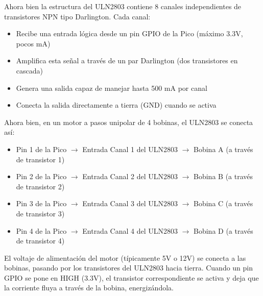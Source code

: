 \documentclass[letterpaper,12pt]{article}
\begin{document}
    Ahora bien la estructura del ULN2803 contiene 8 canales independientes de transistores NPN tipo Darlington. Cada canal:
    \begin{itemize}
        \item Recibe una entrada lógica desde un pin GPIO de la Pico (máximo 3.3V, pocos mA)
        \item Amplifica esta señal a través de un par Darlington (dos transistores en cascada)
        \item Genera una salida capaz de manejar hasta 500 mA por canal
        \item Conecta la salida directamente a tierra (GND) cuando se activa
    \end{itemize}

    Ahora bien, en un motor a pasos unipolar de 4 bobinas, el ULN2803 se conecta así:
    \begin{itemize}
        \item Pin 1 de la Pico $\rightarrow$ Entrada Canal 1 del ULN2803 $\rightarrow$ Bobina A (a través de transistor 1)
        \item Pin 2 de la Pico $\rightarrow$ Entrada Canal 2 del ULN2803 $\rightarrow$ Bobina B (a través de transistor 2)
        \item Pin 3 de la Pico $\rightarrow$ Entrada Canal 3 del ULN2803 $\rightarrow$ Bobina C (a través de transistor 3)
        \item Pin 4 de la Pico $\rightarrow$ Entrada Canal 4 del ULN2803 $\rightarrow$ Bobina D (a través de transistor 4)
    \end{itemize}

    El voltaje de alimentación del motor (típicamente 5V o 12V) se conecta a las bobinas, pasando por los transistores del ULN2803 hacia tierra. Cuando un pin GPIO se pone en HIGH (3.3V), el transistor correspondiente se activa y deja que la corriente fluya a través de la bobina, energizándola.


    \newpage
    \nocite{*} 
    \printbibliography[heading=bibintoc, title={Referencias}]
\end{document}
